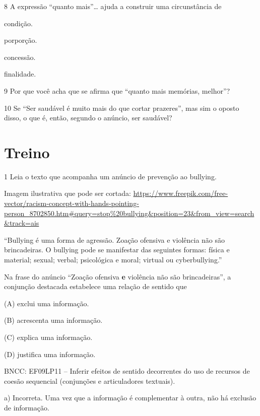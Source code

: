 \begin{itemize}
\begin{itemize}
\num{8} A expressão ``quanto mais''\ldots{} ajuda a construir uma
circunstância de

 condição.

 porporção.

 concessão.

 finalidade.

\num{9} Por que você acha que se afirma que ``quanto mais memórias,
melhor''? 

\num{10} Se ``Ser saudável é muito mais do que cortar prazeres'', mas
sim o oposto disso, o que é, então, segundo o anúncio, ser saudável?

\section{Treino}

\num{1} Leia o texto que acompanha um anúncio de prevenção ao bullying.

Imagem ilustrativa que pode ser cortada:
\url{https://www.freepik.com/free-vector/racism-concept-with-hands-pointing-person_8702850.htm\#query=stop\%20bullying\&position=23\&from_view=search\&track=ais}

``Bullying é uma forma de agressão. Zoação ofensiva e violência não são
brincadeiras. O bullying pode se manifestar das seguintes formas: física
e material; sexual; verbal; psicológica e moral; virtual ou
cyberbullying.''

Na frase do anúncio ``Zoação ofensiva \textbf{e} violência não são
brincadeiras'', a conjunção destacada estabelece uma relação de sentido
que

(A) exclui uma informação.

(B) acrescenta uma informação.

(C) explica uma informação.

(D) justifica uma informação.

BNCC: EF09LP11 -- Inferir efeitos de sentido decorrentes do uso de
recursos de coesão sequencial (conjunções e articuladores textuais).

a) Incorreta. Uma vez que a informação é complementar à outra, não há
exclusão de informação.


\end{itemize}
\end{itemize}
